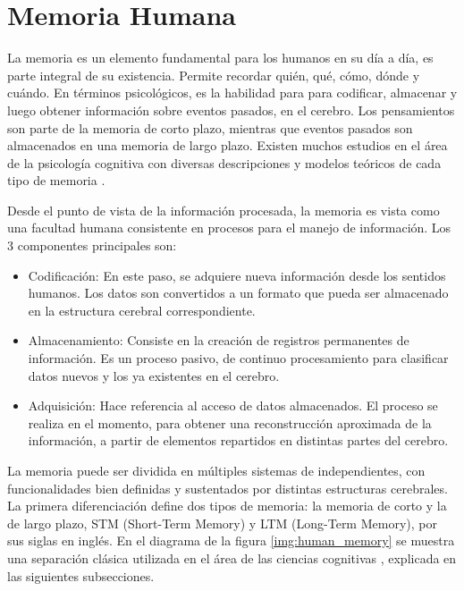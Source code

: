 \section{Memoria Humana}


La memoria es un elemento fundamental para los humanos en su día a día, es parte integral de su existencia. Permite recordar quién, qué, cómo, dónde y cuándo. En términos psicológicos, es la habilidad para para codificar, almacenar y luego obtener información sobre eventos pasados, en el cerebro. Los pensamientos son parte de la memoria de corto plazo, mientras que eventos pasados son almacenados en una memoria de largo plazo. Existen muchos estudios en el área de la psicología cognitiva con diversas descripciones y modelos teóricos de cada tipo de memoria \cite{Vijayakumar2014}.

Desde el punto de vista de la información procesada, la memoria es vista como una facultad humana consistente en procesos para el manejo de información. Los 3 componentes principales son:

\begin{itemize}[topsep=0pt]
\setlength\itemsep{0.2em}
\item Codificación: En este paso, se adquiere nueva información desde los sentidos humanos. Los datos son convertidos a un formato que pueda ser almacenado en la estructura cerebral correspondiente.
\item Almacenamiento: Consiste en la creación de registros permanentes de información. Es un proceso pasivo, de continuo procesamiento para clasificar datos nuevos y los ya existentes en el cerebro.
\item Adquisición: Hace referencia al acceso de datos almacenados. El proceso se realiza en el momento, para obtener una reconstrucción aproximada de la información, a partir de elementos repartidos en distintas partes del cerebro.
\end{itemize}


La memoria puede ser dividida en múltiples sistemas de independientes, con funcionalidades bien definidas y sustentados por distintas estructuras cerebrales. La primera diferenciación define dos tipos de memoria: la memoria de corto y la de largo plazo, STM (Short-Term Memory) y LTM (Long-Term Memory), por sus siglas en inglés. En el diagrama de la figura \ref{img:human_memory} se muestra una separación clásica utilizada en el área de las ciencias cognitivas \cite{Eichenbaum:2008}, explicada en las siguientes subsecciones.

